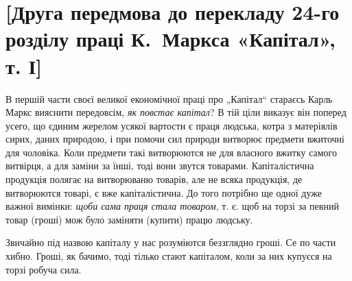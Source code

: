 \section*{[Друга передмова до перекладу 24-го розділу праці К.~Маркса «Капітал», т. І]\protect\footnotemarkZ{}}


\noindent{}В першій части своєї великої економічної праці про „Капітал“ стараєсь Карль Маркс вияснити передовсім, \emph{як повстає капітал}? В тій ціли виказує він поперед усего, що єдиним жерелом усякої вартости є праця людська, котра з матеріялів сирих, даних природою, і при помочи сил природи витворює предмети вжиточні для чоловіка. Коли предмети такі витворюются не для власного вжитку самого витвірця, а для заміни за їнші, тоді вони звутся товарами. Капіталістична продукція полягає на витворюваню товарів, але не всяка продукція, де витворюются товарі, є вже капіталістична. До того потрібно ще одної дуже важної вимінки: \emph{щоби сама праця стала товаром}, т. є. щоб на торзі за певний товар (гроші) мож було заміняти (купити) працю людську.

Звичайно під назвою капіталу у нас розуміются беззглядно гроші. Се по части хибно. Гроші, як бачимо, тоді тілько стают капіталом, коли за них купуєся на торзі робуча сила.

